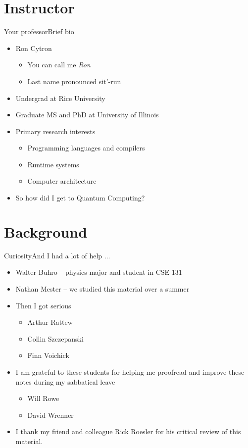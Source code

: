 \section{Instructor}
\begin{frame}{Your professor}{Brief bio}
\begin{itemize}
    \item Ron Cytron
    \begin{itemize}
        \item You can call me \emph{Ron}
        \item Last name pronounced sit'-run
    \end{itemize}
    \item Undergrad at Rice University
    \item Graduate MS and PhD at University of Illinois
    \item Primary research interests
    \begin{itemize}
        \item Programming languages and compilers
        \item Runtime systems
        \item Computer architecture
    \end{itemize}
    \item So how did I get to Quantum Computing?
\end{itemize}
    
\end{frame}

\section{Background}
\begin{frame}{Curiosity}{And I had a lot of help $\ldots$}
\begin{itemize}
    \item Walter Buhro -- physics major and student in CSE 131
    \item Nathan Mester -- we studied this material over a summer
    \item Then I got serious
    \begin{itemize}
        \item Arthur Rattew
        \item Collin Szczepanski
        \item Finn Voichick
    \end{itemize}
    \item I am grateful to these students for helping me proofread and improve these notes during my sabbatical leave
    \begin{itemize}
        \item Will Rowe
        \item David Wrenner
    \end{itemize}
    \item I thank my friend and colleague Rick Roesler for his critical review of this material.
\end{itemize}
    
\end{frame}

